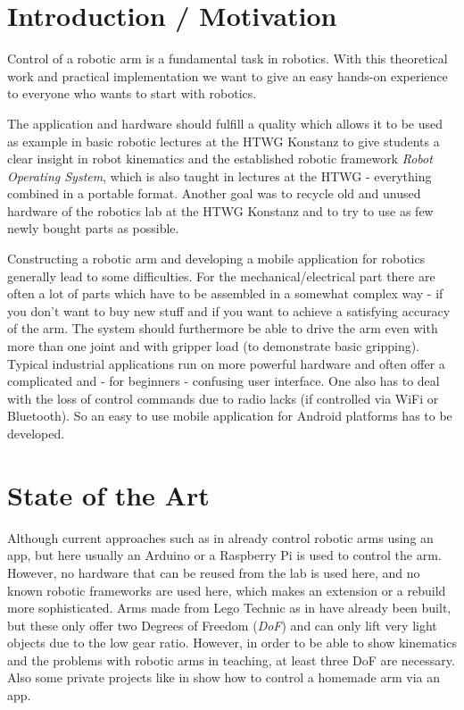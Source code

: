 \documentclass[conference]{IEEEtran}
\begin{document}
\section{Introduction / Motivation}
Control of a robotic arm is a fundamental task in robotics. With this theoretical work and practical implementation we want to give an easy hands-on experience to everyone who wants to start with robotics.\\
\par
The application and hardware should fulfill a quality which allows it to be used as example in basic robotic lectures at the HTWG Konstanz to give students a clear insight in robot kinematics and the established robotic framework \textit{Robot Operating System}\cite{onlROS}, which is also taught in lectures at the HTWG - everything combined in a portable format. 
Another goal was to recycle old and unused hardware of the robotics lab at the HTWG Konstanz and to try to use as few newly bought parts as possible.
\\
\par
Constructing a robotic arm and developing a mobile application for robotics generally lead to some difficulties.
For the mechanical/electrical part there are often a lot of parts which have to be assembled in a somewhat complex way - if you don't want to buy new stuff and if you want to achieve a satisfying accuracy of the arm. The system should furthermore be able to drive the arm even with more than one joint and with gripper load (to demonstrate basic gripping).
Typical industrial applications run on more powerful hardware and often offer a complicated and - for beginners - confusing user interface. One also has to deal with the loss of control commands due to radio lacks (if controlled via WiFi or Bluetooth). So an easy to use mobile application for Android platforms has to be developed. 

\section{State of the Art}
Although current approaches such as in \cite{onlIEEEApp-Arm} already control robotic arms using an app, but here usually an Arduino or a Raspberry Pi is used to control the arm. However, no hardware that can be reused from the lab is used here, and no known robotic frameworks are used here, which makes an extension or a rebuild more sophisticated. Arms made from Lego Technic as in \cite{onlNXT-2DOF} have already been built, but these only offer two Degrees of Freedom (\textit{DoF}) and can only lift very light objects due to the low gear ratio. However, in order to be able to show kinematics and the problems with robotic arms in teaching, at least three DoF are necessary.
Also some private projects like in \cite{onlHackster} show how to control a homemade arm via an app.
\end{document}
